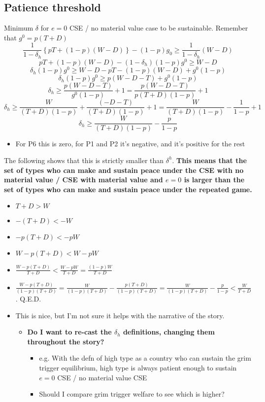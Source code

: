 \documentclass[12pt]{article}
\newcommand{\de}{\delta}
\begin{document}
\subsection{Patience threshold}
Minimum $\de$ for $e=0$ CSE / no material value case to be sustainable. Remember that $g^0 = p(T+D)$
						\[
						  \frac{1}{1-\de_h}\left\{pT + (1-p)(W-D)\right\} - (1-p)g_0 \geq \frac{1}{1-\de_h} (W-D)
						\]
						\[
						  pT + (1-p)(W-D) - (1-\de_h)(1-p) g^0 \geq W-D
						\]
						\[
						  \de_h (1-p) g^0 \geq W-D - pT - (1-p)(W-D) +g^0(1-p)
						\]
						\[
						  \de_h (1-p) g^0 \geq p(W-D-T) +g^0(1-p)
						\]
						\[
						  \de_h \geq \frac{p(W-D-T)}{g^0(1-p)} + 1 = \frac{p(W-D-T)}{p(T+D)(1-p)} + 1 
						\]
						\[
							\de_h \geq \frac{W}{(T+D)(1-p)} + \frac{(-D-T)}{(T+D)(1-p)} + 1 = \frac{W}{(T+D)(1-p)} - \frac{1}{1-p} + 1
						\]
						\[
							\de_h \geq \frac{W}{(T+D)(1-p)} - \frac{p}{1-p}
						\]
							\begin{itemize}
								\item For P6 this is zero, for P1 and P2 it's negative, and it's positive for the rest
							\end{itemize}
						The following shows that this is strictly smaller than $\de^h$. \textbf{This means that the set of types who can make and sustain peace under the CSE with no material value / CSE with material value and $e=0$ is larger than the set of types who can make and sustain peace under the repeated game.}
							\begin{itemize}
								\item $T+D>W$
								\item $-(T+D)<-W$
								\item $-p(T+D)<-pW$
								\item $W-p(T+D)<W-pW$
								\item $\frac{W-p(T+D)}{T+D}<\frac{W-pW}{T+D} = \frac{(1-p)W}{T+D}$
								\item $\frac{W-p(T+D)}{(1-p)(T+D)} = \frac{W}{(1-p)(T+D)} - \frac{p(T+D)}{(1-p)(T+D)} = \frac{W}{(1-p)(T+D)} - \frac{p}{1-p}< \frac{W}{T+D}$. Q.E.D.
								\item This is nice, but I'm not sure it helps with the narrative of the story.
									\begin{itemize}
										\item \textbf{Do I want to re-cast the $\de_h$ definitions, changing them throughout the story?}
											\begin{itemize}
												\item e.g. With the defn of high type as a country who can sustain the grim trigger equilibrium, high type is always patient enough to sustain $e=0$ CSE / no material value CSE
												\item Should I compare grim trigger welfare to see which is higher?
											\end{itemize}
									\end{itemize}
							\end{itemize}
							
\end{document}

